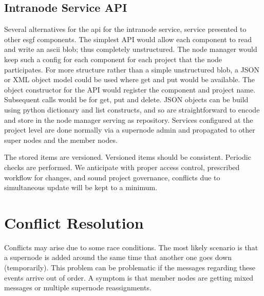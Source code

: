 \documentclass[oneside,12pt]{memoir}
\begin{document}
\subsection{Intranode Service API}

Several alternatives for the api for the intranode service, service presented to other esgf components.   The simplest API would allow each component to read and write an ascii blob; thus completely unstructured.  The node manager would keep such a config for each component for each project that the node participates.  For more structure rather than a simple unstructured blob, a JSON or XML object model could be used where get and put would be available.   The object constructor for the API would register the component and project name.  Subsequent calls would be for get, put and delete.  JSON objects can be build using python dictionary and list constructs, and so are straightforward to encode and store in the node manager serving as repository.   Services configured at the project level are done normally via a supernode admin and propagated to other super nodes and the member nodes.

The stored items are versioned.  Versioned items should be consistent.  Periodic checks are performed.  We anticipate with proper access control, prescribed workflow for changes, and sound project governance, conflicts due to simultaneous update will be kept to a minimum.

\section{Conflict Resolution}

Conflicts may arise due to some race conditions.  The most likely scenario is that a supernode is added around the same time that another one goes down (temporarily).    This problem can be problematic if the messages regarding these events arrive out of order.  A symptom is that member nodes are getting mixed messages or multiple supernode reassignments.
\end{document}
